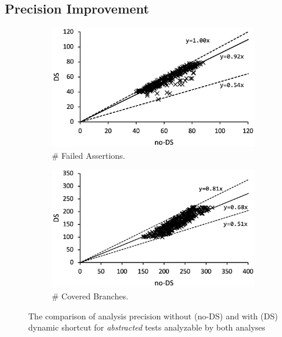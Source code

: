 \subsection{Precision Improvement}

\begin{figure}
  \centering
  \begin{subfigure}[t]{0.48\textwidth}
    \includegraphics[width=\linewidth]{img/precision-fail}
    \vspace*{-1.5em}
    \caption{\# Failed Assertions.}
    \label{fig:precision-fail}
  \end{subfigure}
  \begin{subfigure}[t]{0.48\textwidth}
    \includegraphics[width=\linewidth]{img/precision-branch}
    \vspace*{-1.5em}
    \caption{\# Covered Branches.}
    \label{fig:precision-branch}
  \end{subfigure}
  \vspace*{-1em}
  \caption{The comparison of analysis precision without (no-DS) and with (DS)
  dynamic shortcut for  \textit{abstracted} tests analyzable by both
  analyses}
  \label{fig:precision}
  \vspace*{-1.5em}
\end{figure}

